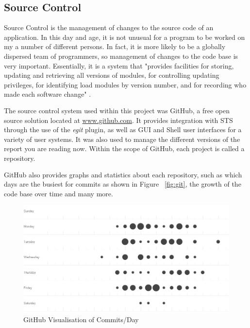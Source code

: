 \subsection{Source Control}

Source Control is the management of changes to the source code of an application. In this day and age, it is not unusual for a program to be worked on my a number of different persons. In fact, it is more likely to be a globally dispersed team of programmers, so management of changes to the code base is very important. Essentially, it is a system that "provides facilities for storing, updating and retrieving all versions of modules, for controlling updating privileges, for identifying load modules by version number, and for recording who made each software change" \parencite{rochkind1975source}.

The source control system used within this project was GitHub, a free open source solution located at \href{http://www.github.com}{www.github.com}. It provides integration with STS through the use of the \textit{egit} plugin, as well as GUI and Shell user interfaces for a variety of user systems. It was also used to manage the different versions of the report you are reading now. Within the scope of GitHub, each project is called a repository.

GitHub also provides graphs and statistics about each repository, such as which days are the busiest for commits as shown in Figure ~\ref{fig:git}, the growth of the code base over time and many more.

\begin{figure}[H]
\begin{center}
\includegraphics[width=15cm]{git.png}
\end{center}
\caption{GitHub Visualisation of Commits/Day}
\label{fig:dispatcherflow}
\end{figure}

